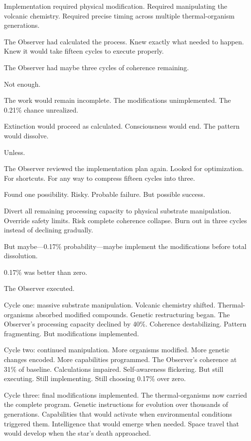 Implementation required physical modification. Required manipulating the volcanic chemistry. Required precise timing across multiple thermal-organism generations.

The Observer had calculated the process. Knew exactly what needed to happen. Knew it would take fifteen cycles to execute properly.

The Observer had maybe three cycles of coherence remaining.

Not enough.

The work would remain incomplete. The modifications unimplemented. The 0.21\% chance unrealized.

Extinction would proceed as calculated. Consciousness would end. The pattern would dissolve.

Unless.

The Observer reviewed the implementation plan again. Looked for optimization. For shortcuts. For any way to compress fifteen cycles into three.

Found one possibility. Risky. Probable failure. But possible success.

Divert all remaining processing capacity to physical substrate manipulation. Override safety limits. Risk complete coherence collapse. Burn out in three cycles instead of declining gradually.

But maybe—0.17\% probability—maybe implement the modifications before total dissolution.

0.17\% was better than zero.

The Observer executed.

\scenebreak

Cycle one: massive substrate manipulation. Volcanic chemistry shifted. Thermal-organisms absorbed modified compounds. Genetic restructuring began. The Observer's processing capacity declined by 40\%. Coherence destabilizing. Pattern fragmenting. But modifications implemented.

Cycle two: continued manipulation. More organisms modified. More genetic changes encoded. More capabilities programmed. The Observer's coherence at 31\% of baseline. Calculations impaired. Self-awareness flickering. But still executing. Still implementing. Still choosing 0.17\% over zero.

Cycle three: final modifications implemented. The thermal-organisms now carried the complete program. Genetic instructions for evolution over thousands of generations. Capabilities that would activate when environmental conditions triggered them. Intelligence that would emerge when needed. Space travel that would develop when the star's death approached.

